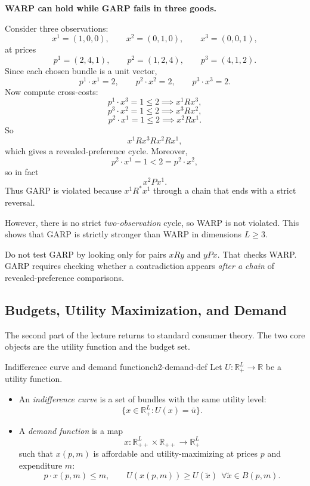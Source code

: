 \begin{examplebox}
\textbf{WARP can hold while GARP fails in three goods.}

Consider three observations:
\[
x^1=(1,0,0),\qquad x^2=(0,1,0),\qquad x^3=(0,0,1),
\]
at prices
\[
p^1=(2,4,1),\qquad p^2=(1,2,4),\qquad p^3=(4,1,2).
\]
Since each chosen bundle is a unit vector,
\[
p^1 \cdot x^1=2,\qquad p^2 \cdot x^2=2,\qquad p^3 \cdot x^3=2.
\]
Now compute cross-costs:
\[
p^1 \cdot x^3 = 1 \le 2 \implies x^1 R x^3,
\]
\[
p^3 \cdot x^2 = 1 \le 2 \implies x^3 R x^2,
\]
\[
p^2 \cdot x^1 = 1 \le 2 \implies x^2 R x^1.
\]
So
\[
x^1 R x^3 R x^2 R x^1,
\]
which gives a revealed-preference cycle. Moreover,
\[
p^2 \cdot x^1 = 1 < 2 = p^2 \cdot x^2,
\]
so in fact
\[
x^2 P x^1.
\]
Thus GARP is violated because $x^1 R^* x^1$ through a chain that ends with a strict reversal.

However, there is no strict \emph{two-observation} cycle, so WARP is not violated. This shows that GARP is strictly stronger than WARP in dimensions $L \ge 3$.
\end{examplebox}

\begin{commonmistake}
Do not test GARP by looking only for pairs $x R y$ and $y P x$. That checks WARP. GARP requires checking whether a contradiction appears \emph{after a chain} of revealed-preference comparisons.
\end{commonmistake}

\subsection{Budgets, Utility Maximization, and Demand}

The second part of the lecture returns to standard consumer theory. The two core objects are the utility function and the budget set.

\begin{definition}{Indifference curve and demand function}{ch2-demand-def}
Let $U : \mathbb{R}^L_+ \to \mathbb{R}$ be a utility function.

\begin{itemize}
    \item An \emph{indifference curve} is a set of bundles with the same utility level:
    \[
    \{x \in \mathbb{R}^L_+ : U(x)=\bar u\}.
    \]
    \item A \emph{demand function} is a map
    \[
    x : \mathbb{R}^L_{++} \times \mathbb{R}_{++} \to \mathbb{R}^L_+
    \]
    such that $x(p,m)$ is affordable and utility-maximizing at prices $p$ and expenditure $m$:
    \[
    p \cdot x(p,m) \le m,
    \qquad
    U(x(p,m)) \ge U(\tilde x)\ \ \forall \tilde x \in B(p,m).
    \]
\end{itemize}
\end{definition}

